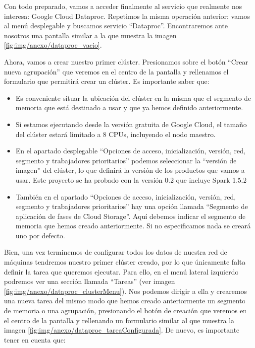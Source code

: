 Con todo preparado, vamos a acceder finalmente al servicio que realmente nos interesa: Google Cloud Dataproc. Repetimos la misma operación anterior: vamos al menú desplegable y buscamos servicio ``Dataproc''. Encontraremos ante nosotros una pantalla similar a la que muestra la imagen \ref{fig:img/anexo/dataproc_vacio}.


Ahora, vamos a crear nuestro primer clúster. Presionamos sobre el botón ``Crear nueva agrupación'' que veremos en el centro de la pantalla y rellenamos el formulario que permitirá crear un clúster. Es importante saber que:

\begin{itemize}
\item Es conveniente situar la ubicación del clúster en la misma que el segmento de memoria que está destinado a usar y que ya hemos definido anteriormente.
\item Si estamos ejecutando desde la versión gratuita de Google Cloud, el tamaño del clúster estará limitado a 8 CPUs, incluyendo el nodo maestro.
\item En el apartado desplegable ``Opciones de acceso, inicialización, versión, red, segmento y trabajadores prioritarios'' podemos seleccionar la ``versión de imagen'' del clúster, lo que definirá la versión de los productos que vamos a usar. Este proyecto se ha probado con la versión 0.2 que incluye Spark 1.5.2
\item También en el apartado ``Opciones de acceso, inicialización, versión, red, segmento y trabajadores prioritarios'' hay una opción llamada ``Segmento de aplicación de fases de Cloud Storage''. Aquí debemos indicar el segmento de memoria que hemos creado anteriormente. Si no especificamos nada se creará uno por defecto.
\end{itemize}


Bien, una vez terminemos de configurar todos los datos de nuestra red de máquinas  tendremos nuestro primer clúster creado, por lo que únicamente falta definir la tarea que queremos ejecutar. Para ello, en el menú lateral izquierdo podremos ver una sección llamada ``Tareas'' (ver imagen \ref{fig:img/anexo/dataproc_clusterMenu}). Nos podemos dirigir a ella y crearemos una nueva tarea del mismo modo que hemos creado anteriormente un segmento de memoria o una agrupación, presionando el botón de creación que veremos en el centro de la pantalla y rellenando un formulario similar al que muestra la imagen \ref{fig:img/anexo/dataproc_tareaConfigurada}. De nuevo, es importante tener en cuenta que:

